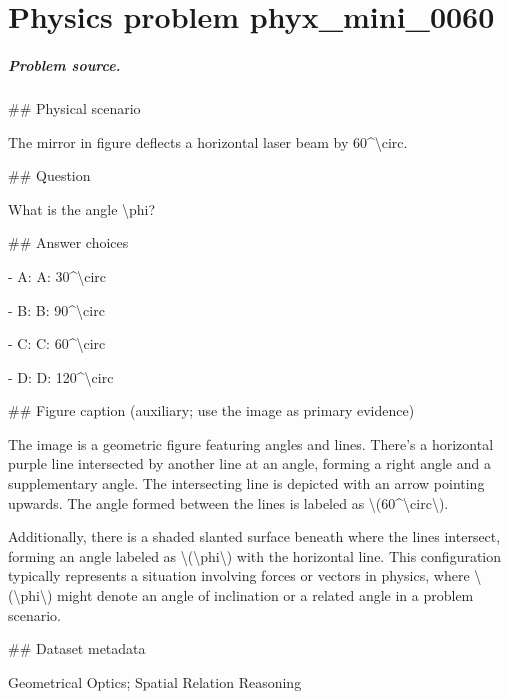 
\chapter{Physics problem phyx\_mini\_0060}
\label{ch:PhyXMiniProblems_problem_phyx_mini_0060}

\paragraph{Problem source.}
\#\# Physical scenario

The mirror in figure deflects a horizontal laser beam by 60\textasciicircum{}\textbackslash{}circ.

\#\# Question

What is the angle \textbackslash{}phi?

\#\# Answer choices

- A: A: 30\textasciicircum{}\textbackslash{}circ

- B: B: 90\textasciicircum{}\textbackslash{}circ

- C: C: 60\textasciicircum{}\textbackslash{}circ

- D: D: 120\textasciicircum{}\textbackslash{}circ

\#\# Figure caption (auxiliary; use the image as primary evidence)

The image is a geometric figure featuring angles and lines. There's a horizontal purple line intersected by another line at an angle, forming a right angle and a supplementary angle. The intersecting line is depicted with an arrow pointing upwards. The angle formed between the lines is labeled as \textbackslash{}(60\textasciicircum{}\textbackslash{}circ\textbackslash{}).

Additionally, there is a shaded slanted surface beneath where the lines intersect, forming an angle labeled as \textbackslash{}(\textbackslash{}phi\textbackslash{}) with the horizontal line. This configuration typically represents a situation involving forces or vectors in physics, where \textbackslash{}(\textbackslash{}phi\textbackslash{}) might denote an angle of inclination or a related angle in a problem scenario.

\#\# Dataset metadata

Geometrical Optics; Spatial Relation Reasoning

